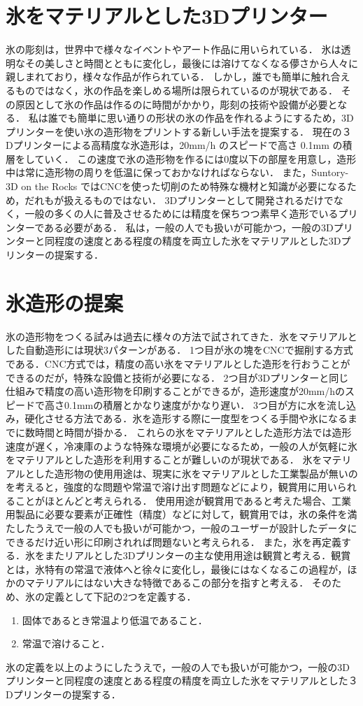 \section{氷をマテリアルとした3Dプリンター}
\label{sec:paragraph}

氷の彫刻は，世界中で様々なイベントやアート作品に用いられている．
氷は透明なその美しさと時間とともに変化し，最後には溶けてなくなる儚さから人々に親しまれており，様々な作品が作られている．
しかし，誰でも簡単に触れ合えるものではなく，氷の作品を楽しめる場所は限られているのが現状である．
その原因として氷の作品は作るのに時間がかかり，彫刻の技術や設備が必要となる．
私は誰でも簡単に思い通りの形状の氷の作品を作れるようにするため，3Dプリンターを使い氷の造形物をプリントする新しい手法を提案する．
現在の３Dプリンターによる高精度な氷造形は，20mm/h のスピードで高さ 0.1mm の積層をしていく．
この速度で氷の造形物を作るには0度以下の部屋を用意し，造形中は常に造形物の周りを低温に保っておかなければならない．
また，Suntory-3D on the Rocks \cite{b} ではCNCを使った切削のため特殊な機材と知識が必要になるため，だれもが扱えるものではない．
3Dプリンターとして開発されるだけでなく，一般の多くの人に普及させるためには精度を保ちつつ素早く造形でいるプリンターである必要がある．
私は，一般の人でも扱いが可能かつ，一般の3Dプリンターと同程度の速度とある程度の精度を両立した氷をマテリアルとした3Dプリンターの提案する．

\section{氷造形の提案}
\label{sec:enum}

氷の造形物をつくる試みは過去に様々の方法で試されてきた．氷をマテリアルとした自動造形には現状3パターンがある．
1つ目が氷の塊をCNCで掘削する方式である．CNC方式では，精度の高い氷をマテリアルとした造形を行おうことができるのだが，特殊な設備と技術が必要になる．
2つ目が3Dプリンターと同じ仕組みで精度の高い造形物を印刷することができるが，造形速度が20mm/hのスピードで高さ0.1mmの積層とかなり速度がかなり遅い．
3つ目が方に水を流し込み，硬化させる方法である．氷を造形する際に一度型をつくる手間や氷になるまでに数時間と時間が掛かる．
これらの氷をマテリアルとした造形方法では造形速度が遅く，冷凍庫のような特殊な環境が必要になるため，一般の人が気軽に氷をマテリアルとした造形を利用することが難しいのが現状である．
氷をマテリアルとした造形物の使用用途は、現実に氷をマテリアルとした工業製品が無いのを考えると，強度的な問題や常温で溶け出す問題などにより，観賞用に用いられることがほとんどと考えられる．
使用用途が観賞用であると考えた場合、工業用製品に必要な要素が正確性（精度）などに対して，観賞用では，氷の条件を満たしたうえで一般の人でも扱いが可能かつ，一般のユーザーが設計したデータにできるだけ近い形に印刷されれば問題ないと考えられる．
また，氷を再定義する．氷をまたリアルとした3Dプリンターの主な使用用途は観賞と考える．観賞とは，氷特有の常温で液体へと徐々に変化し，最後にはなくなるこの過程が，ほかのマテリアルにはない大きな特徴であるこの部分を指すと考える．
そのため、氷の定義として下記の2つを定義する．

\begin{enumerate}
  \item 固体であるとき常温より低温であること． 
  \item 常温で溶けること．
 \end{enumerate}

氷の定義を以上のようにしたうえで，一般の人でも扱いが可能かつ，一般の3Dプリンターと同程度の速度とある程度の精度を両立した氷をマテリアルとした３Dプリンターの提案する．

